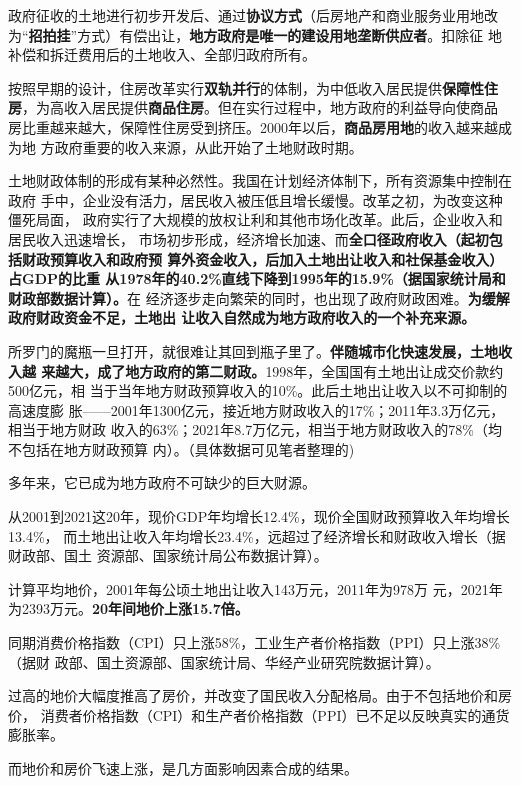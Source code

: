 政府征收的土地进行初步开发后、通过\textbf{协议方式}（后房地产和商业服务业用地改
为“\textbf{招拍挂}”方式）有偿出让，\textbf{地方政府是唯一的建设用地垄断供应者}。扣除征
地补偿和拆迁费用后的土地收入、全部归政府所有。

按照早期的设计，住房改革实行\textbf{双轨并行}的体制，为中低收入居民提供\textbf{保障性住
  房}，为高收入居民提供\textbf{商品住房}。但在实行过程中，地方政府的利益导向使商品
房比重越来越大，保障性住房受到挤压。2000年以后，\textbf{商品房用地}的收入越来越成为地
方政府重要的收入来源，从此开始了土地财政时期。

土地财政体制的形成有某种必然性。我国在计划经济体制下，所有资源集中控制在政府
手中，企业没有活力，居民收入被压低且增长缓慢。改革之初，为改变这种僵死局面，
政府实行了大规模的放权让利和其他市场化改革。此后，企业收入和居民收入迅速增长，
市场初步形成，经济增长加速、而\textbf{全口径政府收入（起初包括财政预算收入和政府预
  算外资金收入，后加入土地出让收入和社保基金收入）占GDP的比重
  从1978年的40.2\%直线下降到1995年的15.9\%（据国家统计局和财政部数据计算）。}在
经济逐步走向繁荣的同时，也出现了政府财政困难。\textbf{为缓解政府财政资金不足，土地出
让收入自然成为地方政府收入的一个补充来源。}

所罗门的魔瓶一旦打开，就很难让其回到瓶子里了。\textbf{伴随城市化快速发展，土地收入越
来越大，成了地方政府的第二财政。}1998年，全国国有土地出让成交价款约500亿元，相
当于当年地方财政预算收入的10\%。此后土地出让收入以不可抑制的高速度膨
胀——2001年1300亿元，接近地方财政收入的17\%；2011年3.3万亿元，相当于地方财政
收入的63\%；2021年8.7万亿元，相当于地方财政收入的78\%（均不包括在地方财政预算
内）。（具体数据可见笔者整理的)

多年来，它已成为地方政府不可缺少的巨大财源。

从2001到2021这20年，现价GDP年均增长12.4\%，现价全国财政预算收入年均增长13.4\%，
而土地出让收入年均增长23.4\%，远超过了经济增长和财政收入增长（据财政部、国土
资源部、国家统计局公布数据计算）。

计算平均地价，2001年每公顷土地出让收入143万元，2011年为978万
元，2021年为2393万元。\textbf{20年间地价上涨15.7倍。}

同期消费价格指数（CPI）只上涨58\%，工业生产者价格指数（PPI）只上涨38\%（据财
政部、国土资源部、国家统计局、华经产业研究院数据计算）。

过高的地价大幅度推高了房价，并改变了国民收入分配格局。由于不包括地价和房价，
消费者价格指数（CPI）和生产者价格指数（PPI）已不足以反映真实的通货膨胀率。

而地价和房价飞速上涨，是几方面影响因素合成的结果。

